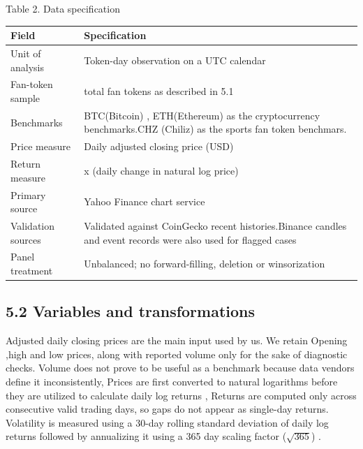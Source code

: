 \documentclass[11pt,a4paper,onecolumn]{article}
\newcommand{\reportcaption}[1]{{\small\raggedright #1\par}\nopagebreak\vspace{3pt}}
\begin{document}
\par\addvspace{5pt}\noindent\begin{minipage}{\linewidth}\reportcaption{Table 2. Data specification}

\begingroup\small\renewcommand{\arraystretch}{1.18}\setlength{\tabcolsep}{4pt}
\noindent\begin{tabular}{|>{\raggedright\arraybackslash}p{0.219697\dimexpr\linewidth-4\tabcolsep-3\arrayrulewidth\relax}>{\raggedright\arraybackslash}p{0.780303\dimexpr\linewidth-4\tabcolsep-3\arrayrulewidth\relax}|}
\hline\rowcolor[HTML]{E8E8E8} \bfseries Field & \bfseries Specification \\ \hline
Unit of analysis & Token-day observation on a UTC calendar \\ \hline
Fan-token sample & 20 total fan tokens as described in 5.1 \\ \hline
Benchmarks & BTC(Bitcoin) , ETH(Ethereum) as the cryptocurrency benchmarks.CHZ (Chiliz) as the sports fan token benchmars. \\ \hline
Price measure & Daily adjusted closing price (USD) \\ \hline
Return measure & 100 x (daily change in natural log price) \\ \hline
Primary source & Yahoo Finance chart service \\ \hline
Validation sources & Validated against CoinGecko recent histories.Binance candles and event records were also used for flagged cases \\ \hline
Panel treatment & Unbalanced; no forward-filling, deletion or winsorization \\ \hline
\end{tabular}\endgroup\end{minipage}\par\addvspace{5pt}

\subsection{5.2 Variables and transformations}

Adjusted daily closing prices are the main input used by us. We retain Opening ,high and low prices, along with reported volume only for the sake of diagnostic checks. Volume does not prove to be useful as a benchmark because data vendors define it inconsistently, Prices are first converted to natural logarithms before they are utilized to calculate daily log returns , Returns are computed only across consecutive valid trading days, so gaps do not appear as single-day returns. Volatility is measured using a 30-day rolling standard deviation of daily log returns followed by annualizing it using a 365 day scaling factor (\(\sqrt{365}\)) .
\end{document}
